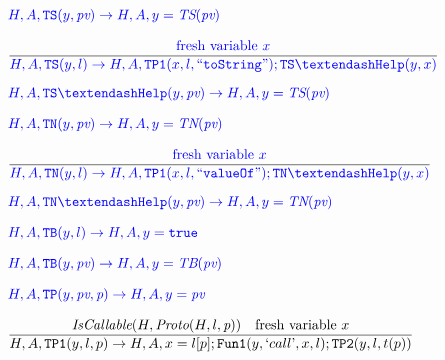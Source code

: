 \documentclass[a4paper, leqno]{amsart}
\newcommand{\squote}[1]{\text{`}#1\text{'}}
\def\inblue{\color{blue}}
\newcommand{\true}{{\tt true}}
\newcommand{\pv}{\emph{pv}}
\newcommand{\pn}{\emph{p}}
\begin{document}
\[
\begin{array}{l@{}l@{}ll}
 & \ \ &\inblue
       H,A,{\tt TS}(y,\pv) \rightarrow H,A,y = \emph{TS}(\pv)
& \\[1em]
 & \ \ & \frac{
    \begin{matrix}\inblue
      \mbox{fresh variable }x
    \end{matrix}}{
    \begin{matrix}\inblue
       H,A,{\tt TS}(y,l) \rightarrow H,A,{\tt TP1}(x,l,{\tt``toString"}); {\tt TS\textendash Help}(y,x)
    \end{matrix}} & \\[1.5em]
 & \ \ &\inblue
       H,A,{\tt TS\textendash Help}(y,\pv) \rightarrow H,A,y=\emph{TS}(\pv)
& \\[1em]

& \ \ &\inblue
       H,A,{\tt TN}(y,\pv) \rightarrow H,A,y=\emph{TN}(\pv)
& \\[1em]
 & \ \ & \frac{
    \begin{matrix}\inblue
      \mbox{fresh variable }x
    \end{matrix}}{
    \begin{matrix}\inblue
       H,A,{\tt TN}(y,l) \rightarrow H,A,{\tt TP1}(x,l,{\tt ``valueOf"}); {\tt TN\textendash Help}(y,x)
    \end{matrix}} & \\[1.5em]
 & \ \ &\inblue
        H,A,{\tt TN\textendash Help}(y,\pv) \rightarrow H,A,y=\emph{TN}(\pv)
& \\[1em]

 & \ \ & \inblue H,A,{\tt TB}(y,l) \rightarrow H,A,y=\true& \\[1em]

 & \ \ & \inblue
       H,A,{\tt TB}(y,\pv) \rightarrow H,A,y=\emph{TB}(\pv)
& \\[1em]


 & \ \ & \inblue H,A,{\tt TP}(y,\pv,\pn) \rightarrow H,A,y=\pv& \\[1em]

 & \ \ & \frac{
    \begin{matrix}
       \emph{IsCallable}(H,\emph{Proto}(H,l,\pn)) & \mbox{fresh variable }x
    \end{matrix}}{
    \begin{matrix}
       H,A,{\tt TP1}(y,l,p) \rightarrow H,A,x=l[p];{\tt Fun1}(y,\squote{call},x,l);{\tt TP2}(y,l,t(p))
    \end{matrix}} & \\[1.5em]


\end{array}\]
\end{document}
